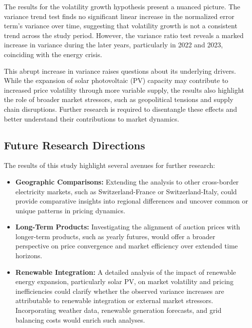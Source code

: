 \documentclass[12pt]{article}
\begin{document}
The results for the volatility growth hypothesis present a nuanced picture. The variance trend test finds no significant linear increase in the normalized error term's variance over time, suggesting that volatility growth is not a consistent trend across the study period. However, the variance ratio test reveals a marked increase in variance during the later years, particularly in 2022 and 2023, coinciding with the energy crisis.

This abrupt increase in variance raises questions about its underlying drivers. While the expansion of solar photovoltaic (PV) capacity may contribute to increased price volatility through more variable supply, the results also highlight the role of broader market stressors, such as geopolitical tensions and supply chain disruptions. Further research is required to disentangle these effects and better understand their contributions to market dynamics.

\subsection{Future Research Directions}

The results of this study highlight several avenues for further research:
\begin{itemize}
    \item \textbf{Geographic Comparisons:} Extending the analysis to other cross-border electricity markets, such as Switzerland-France or Switzerland-Italy, could provide comparative insights into regional differences and uncover common or unique patterns in pricing dynamics.
    \item \textbf{Long-Term Products:} Investigating the alignment of auction prices with longer-term products, such as yearly futures, would offer a broader perspective on price convergence and market efficiency over extended time horizons.
    \item \textbf{Renewable Integration:} A detailed analysis of the impact of renewable energy expansion, particularly solar PV, on market volatility and pricing inefficiencies could clarify whether the observed variance increases are attributable to renewable integration or external market stressors. Incorporating weather data, renewable generation forecasts, and grid balancing costs would enrich such analyses.
\end{itemize}
\end{document}
